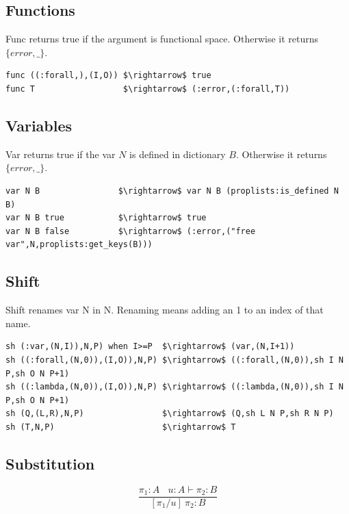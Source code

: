 \documentclass[11pt,oneside]{article}
\begin{document}
\subsection{Functions}
Func returns true if the argument is functional space. Otherwise it returns $\{error,\_\}$.

\begin{lstlisting}[mathescape=true]
func ((:forall,),(I,O)) $\rightarrow$ true
func T                  $\rightarrow$ (:error,(:forall,T))
\end{lstlisting}

\subsection{Variables}
Var returns true if the var $N$ is defined in dictionary $B$. Otherwise it returns $\{error,\_\}$.

\begin{lstlisting}[mathescape=true]
var N B                $\rightarrow$ var N B (proplists:is_defined N B)
var N B true           $\rightarrow$ true
var N B false          $\rightarrow$ (:error,("free var",N,proplists:get_keys(B)))
\end{lstlisting}

\subsection{Shift}
Shift renames var N in N. Renaming means adding an 1 to an index of that name.

\begin{lstlisting}[mathescape=true]
sh (:var,(N,I)),N,P) when I>=P  $\rightarrow$ (var,(N,I+1))
sh ((:forall,(N,0)),(I,O)),N,P) $\rightarrow$ ((:forall,(N,0)),sh I N P,sh O N P+1)
sh ((:lambda,(N,0)),(I,O)),N,P) $\rightarrow$ ((:lambda,(N,0)),sh I N P,sh O N P+1)
sh (Q,(L,R),N,P)                $\rightarrow$ (Q,sh L N P,sh R N P)
sh (T,N,P)                      $\rightarrow$ T
\end{lstlisting}

\subsection{Substitution}

\begin{equation}
\tag{subst}
\dfrac
{\pi_1 : A\ \ \ \ u:A \vdash \pi_2 : B}
{[\pi_1/u]\ \pi_2 : B}
\end{equation}
\end{document}
